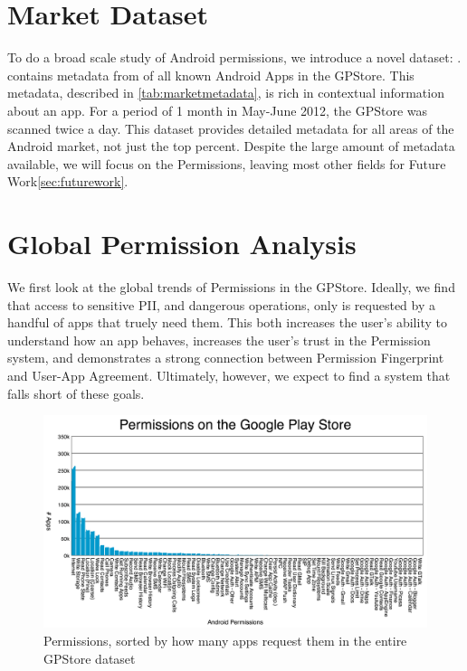 \section{Market Dataset}
To do a broad scale study of Android permissions, we introduce a novel dataset: .  contains metadata from  of all known Android Apps in the GPStore. This metadata, described in \ref{tab:marketmetadata}, is rich in contextual information about an app. For a period of 1 month in May-June 2012, the GPStore was scanned twice a day. This dataset provides detailed metadata for all areas of the Android market, not just the top percent. Despite the large amount of metadata available, we will focus on the Permissions, leaving most other fields for Future Work\ref{sec:futurework}.



\section{Global Permission Analysis}
We first look at the global trends of Permissions in the GPStore. Ideally, we find that access to sensitive PII, and dangerous operations, only is requested by a handful of apps that truely need them. This both increases the user's ability to understand how an app behaves, increases the user's trust in the Permission system, and demonstrates a strong connection between Permission Fingerprint and User-App Agreement. Ultimately, however, we expect to find a system that falls short of these goals.

\begin{figure}[t]
\begin{center}
\includegraphics[width=1.0\columnwidth]{figs/AllPermissions}
\caption{Permissions, sorted by how many apps request them in the entire GPStore dataset}
\label{fig:allpermissions}
\end{center}
\end{figure}

